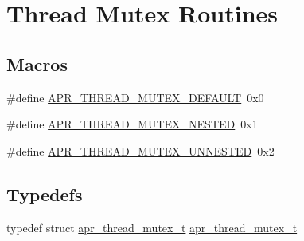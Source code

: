 \hypertarget{group__apr__thread__mutex}{}\section{Thread Mutex Routines}
\label{group__apr__thread__mutex}
\subsection*{Macros}
\begin{DoxyCompactItemize}
\item 
\#define \hyperlink{group__apr__thread__mutex_ga579050872f9aff06e773b084264f7d06}{A\+P\+R\+\_\+\+T\+H\+R\+E\+A\+D\+\_\+\+M\+U\+T\+E\+X\+\_\+\+D\+E\+F\+A\+U\+LT}~0x0
\item 
\#define \hyperlink{group__apr__thread__mutex_gaf421e0445dbc3c739130f5f6544c2e78}{A\+P\+R\+\_\+\+T\+H\+R\+E\+A\+D\+\_\+\+M\+U\+T\+E\+X\+\_\+\+N\+E\+S\+T\+ED}~0x1
\item 
\#define \hyperlink{group__apr__thread__mutex_gac31107f3db115edc0c26ea48943c6a16}{A\+P\+R\+\_\+\+T\+H\+R\+E\+A\+D\+\_\+\+M\+U\+T\+E\+X\+\_\+\+U\+N\+N\+E\+S\+T\+ED}~0x2
\end{DoxyCompactItemize}
\subsection*{Typedefs}
\begin{DoxyCompactItemize}
\item 
typedef struct \hyperlink{group__apr__thread__mutex_ga95712060ba3a192036416e1ccef1db75}{apr\+\_\+thread\+\_\+mutex\+\_\+t} \hyperlink{group__apr__thread__mutex_ga95712060ba3a192036416e1ccef1db75}{apr\+\_\+thread\+\_\+mutex\+\_\+t}
\end{DoxyCompactItemize}
